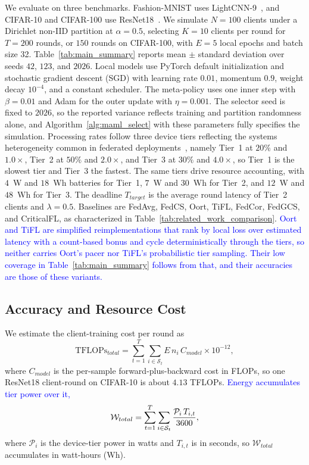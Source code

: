 \documentclass[journal]{IEEEtran}
\theoremstyle{remark}
\newcommand{\revision}[1]{#1}
\newcommand{\revtwo}[1]{\textcolor{blue}{#1}}
\begin{document}
\revision{We evaluate on three benchmarks. Fashion-MNIST uses LightCNN-9~\cite{wu2018light}, and CIFAR-10 and CIFAR-100 use ResNet18~\cite{he2016deep}.} \revision{We simulate $N = 100$ clients under a Dirichlet non-IID partition at $\alpha = 0.5$, selecting $K = 10$ clients per round for $T = 200$ rounds, or $150$ rounds on CIFAR-100, with $E = 5$ local epochs and batch size 32. Table~\ref{tab:main_summary} reports mean $\pm$ standard deviation over seeds $42$, $123$, and $2026$. Local models use PyTorch default initialization and stochastic gradient descent (SGD) with learning rate $0.01$, momentum $0.9$, weight decay $10^{-4}$, and a constant scheduler. The meta-policy uses one inner step with $\beta=0.01$ and Adam for the outer update with $\eta=0.001$. The selector seed is fixed to $2026$, so the reported variance reflects training and partition randomness alone, and Algorithm~\ref{alg:maml_select} with these parameters fully specifies the simulation. Processing rates follow three device tiers reflecting the systems heterogeneity common in federated deployments~\cite{li2020federated}, namely Tier~1 at $20\%$ and $1.0\times$, Tier~2 at $50\%$ and $2.0\times$, and Tier~3 at $30\%$ and $4.0\times$, so Tier~1 is the slowest tier and Tier~3 the fastest. The same tiers drive resource accounting, with $4$~W and $18$~Wh batteries for Tier~1, $7$~W and $30$~Wh for Tier~2, and $12$~W and $48$~Wh for Tier~3.} {\color{black}The deadline $T_{target}$ is the average round latency of Tier~2 clients and $\lambda = 0.5$. \revision{Baselines are FedAvg, FedCS, Oort, TiFL, FedCor, FedGCS, and CriticalFL, as characterized in Table~\ref{tab:related_work_comparison}.} \revtwo{Oort and TiFL are simplified reimplementations that rank by local loss over estimated latency with a count-based bonus and cycle deterministically through the tiers, so neither carries Oort's pacer nor TiFL's probabilistic tier sampling. Their low coverage in Table~\ref{tab:main_summary} follows from that, and their accuracies are those of these variants.}}

\subsection{\revision{Accuracy and Resource Cost}}\label{sec:results_acc}
\revision{We estimate the client-training cost per round as}
\begin{equation}
	\text{TFLOPs}_{total} = \sum_{t=1}^{T} \sum_{i \in \mathcal{S}_t} E\, n_i\, C_{model} \times 10^{-12},
	\label{eq:tflops}
\end{equation}
\revision{where $C_{model}$ is the per-sample forward-plus-backward cost in FLOPs, so one ResNet18 client-round on CIFAR-10 is about $4.13$ TFLOPs.} \revtwo{Energy accumulates tier power over it,}
\begin{equation}
\color{black}
\mathcal{W}_{total}=\sum_{t=1}^{T}\sum_{i\in\mathcal{S}_t} \frac{\mathcal{P}_i\,T_{i,t}}{3600},
\label{eq:energy}
\end{equation}
\revision{where $\mathcal{P}_i$ is the device-tier power in watts and $T_{i,t}$ is in seconds, so $\mathcal{W}_{total}$ accumulates in watt-hours (Wh).}
\end{document}
